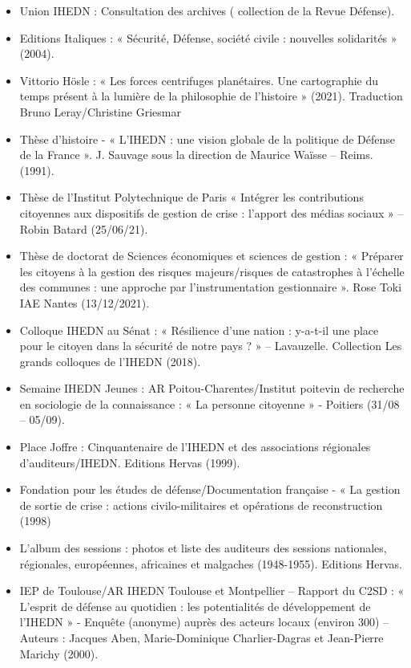 \documentclass[10pt,a4paper]{article}
\begin{document}
\begin{itemize}
\item Union IHEDN : Consultation des archives ( collection  de la Revue Défense).
\item Editions Italiques : « Sécurité, Défense, société civile : nouvelles solidarités » (2004).
\item Vittorio Hösle : « Les forces centrifuges planétaires. Une cartographie du temps présent à la lumière de la philosophie de l'histoire » (2021). Traduction Bruno Leray/Christine Griesmar
\item Thèse d'histoire - « L'IHEDN : une vision globale de la politique de Défense de la France ». J. Sauvage sous la direction de Maurice Waïsse -- Reims. (1991).
\item Thèse de l'Institut Polytechnique de Paris « Intégrer les contributions citoyennes aux dispositifs de gestion de crise : l'apport des médias sociaux »   -- Robin Batard (25/06/21).
\item Thèse de doctorat de Sciences économiques et sciences de gestion : « Préparer les citoyens à la gestion des risques majeurs/risques de catastrophes à l'échelle des communes : une approche par l'instrumentation gestionnaire ». Rose Toki IAE Nantes (13/12/2021).
\item Colloque IHEDN au Sénat : « Résilience d'une nation : y-a-t-il une place pour le citoyen dans la sécurité de notre pays ? » --  Lavauzelle. Collection Les grands colloques de l'IHEDN (2018).
\item Semaine IHEDN Jeunes : AR Poitou-Charentes/Institut poitevin de recherche en sociologie de la connaissance : « La personne citoyenne » - Poitiers (31/08 -- 05/09).
\item Place Joffre : Cinquantenaire de l'IHEDN et des associations régionales d'auditeurs/IHEDN. Editions Hervas (1999).
\item Fondation pour les études de défense/Documentation française - « La gestion de sortie de crise : actions civilo-militaires et opérations de reconstruction (1998)
\item L'album des sessions : photos et liste des auditeurs des sessions nationales, régionales, européennes, africaines et malgaches (1948-1955). Editions Hervas.
\item IEP de Toulouse/AR IHEDN Toulouse et Montpellier -- Rapport du C2SD : « L'esprit de défense au quotidien : les potentialités de développement de l'IHEDN » - Enquête (anonyme) auprès des acteurs locaux (environ 300) -- Auteurs : Jacques Aben, Marie-Dominique Charlier-Dagras et Jean-Pierre Marichy (2000).

\end{itemize}
\end{document}
